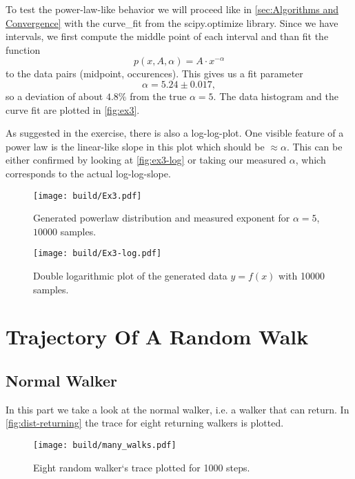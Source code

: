 \documentclass{article}
\begin{document}
To test the power-law-like behavior we will proceed like in \autoref{sec:Algorithms and Convergence} with 
the curve\_fit from the scipy.optimize library. Since we have intervals, we first compute the middle point
of each interval and than fit the function
\[
  p(x, A, \alpha) = A \cdot x^{-\alpha}
\]
to the data pairs (midpoint, occurences). This gives us a fit parameter 
\[
  \alpha = 5.24 \pm 0.017,
\]
so a deviation of about $4.8\%$ from the true $\alpha = 5$. The data histogram and the curve fit are plotted in 
\autoref{fig:ex3}.

As suggested in the exercise, there is also a log-log-plot. One visible feature of a power law is the linear-like
slope in this plot which should be $\approx \alpha$. This can be either confirmed by looking at 
\autoref{fig:ex3-log} or taking our measured $\alpha$, which corresponds to the actual log-log-slope.
\begin{figure}[H]
	\centering
	\texttt{[image: build/Ex3.pdf]}
	\caption{Generated powerlaw distribution and measured exponent for $\alpha = 5$, $10000$ samples.}
  \label{fig:ex3}
\end{figure}
\begin{figure}[H]
	\centering
	\texttt{[image: build/Ex3-log.pdf]}
	\caption{Double logarithmic plot of the generated data $y = f(x)$ with 10000 samples.}
  \label{fig:ex3-log}
\end{figure}



\section{Trajectory Of A Random Walk}
\label{sec:Trajectory Of A Random Walk}

\subsection{Normal Walker}
\label{sec:Normal Walker}
In this part we take a look at the normal walker, i.e. a walker that can return.
In \autoref{fig:dist-returning} the trace for eight returning walkers is plotted. 
\begin{figure}[H]
	\centering
	\texttt{[image: build/many\_walks.pdf]}
	\caption{Eight random walker`s trace plotted for 1000 steps.}
  \label{fig:dist-returning}
\end{figure}
\end{document}
